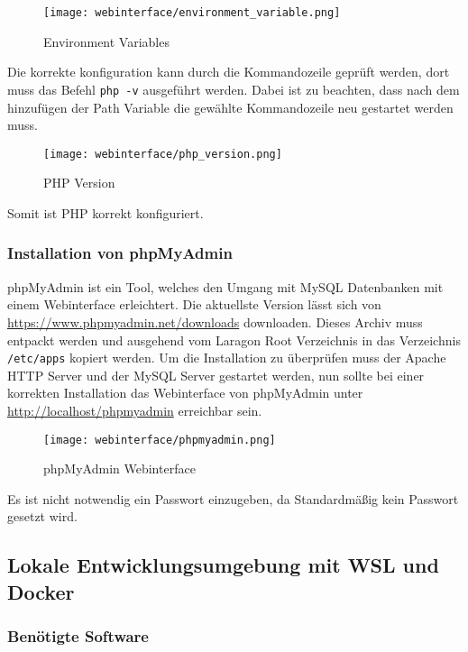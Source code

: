 \begin{figure}[H]
  \centering
  \texttt{[image: webinterface/environment\_variable.png]}
  \caption{Environment Variables}
\end{figure}

Die korrekte konfiguration kann durch die Kommandozeile geprüft werden, dort
muss das Befehl \verb|php -v| ausgeführt werden. Dabei ist zu beachten, dass
nach dem hinzufügen der Path Variable die gewählte Kommandozeile neu gestartet
werden muss.

\begin{figure}[H]
  \centering
  \texttt{[image: webinterface/php\_version.png]}
  \caption{PHP Version}
\end{figure}

Somit ist PHP korrekt konfiguriert.


\subsubsection{Installation von phpMyAdmin}
phpMyAdmin ist ein Tool, welches den Umgang mit MySQL Datenbanken mit einem
Webinterface erleichtert. Die aktuellste Version lässt sich von
\url{https://www.phpmyadmin.net/downloads} downloaden. Dieses Archiv muss
entpackt werden und ausgehend vom Laragon Root Verzeichnis in das Verzeichnis
\verb|/etc/apps| kopiert werden. Um die Installation zu überprüfen muss der
Apache HTTP Server und der MySQL Server gestartet werden, nun sollte bei einer
korrekten Installation das Webinterface von phpMyAdmin unter
\url{http://localhost/phpmyadmin} erreichbar sein.

\begin{figure}[H]
  \centering
  \texttt{[image: webinterface/phpmyadmin.png]}
  \caption{phpMyAdmin Webinterface}
\end{figure}

Es ist nicht notwendig ein Passwort einzugeben, da Standardmäßig kein Passwort
gesetzt wird.


\subsection{Lokale Entwicklungsumgebung mit WSL und Docker}


\subsubsection{Benötigte Software}

